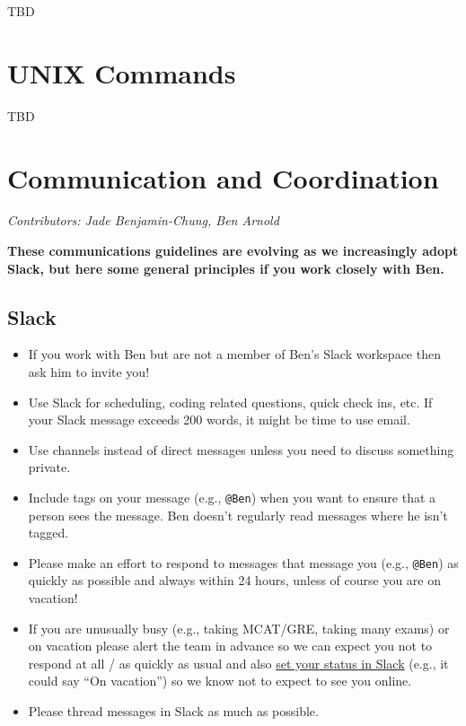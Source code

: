 \documentclass[]{book}
\begin{document}
TBD

\hypertarget{unix}{%
\chapter{UNIX Commands}\label{unix}}

TBD

\hypertarget{commcoord}{%
\chapter{Communication and Coordination}\label{commcoord}}

\emph{Contributors: Jade Benjamin-Chung, Ben Arnold}

\textbf{These communications guidelines are evolving as we increasingly adopt Slack, but here some general principles if you work closely with Ben.}

\hypertarget{slack}{%
\section{Slack}\label{slack}}

\begin{itemize}
\item
  If you work with Ben but are not a member of Ben's Slack workspace then ask him to invite you!
\item
  Use Slack for scheduling, coding related questions, quick check ins, etc. If your Slack message exceeds 200 words, it might be time to use email.
\item
  Use channels instead of direct messages unless you need to discuss something private.
\item
  Include tags on your message (e.g., \texttt{@Ben}) when you want to ensure that a person sees the message. Ben doesn't regularly read messages where he isn't tagged.
\item
  Please make an effort to respond to messages that message you (e.g., \texttt{@Ben}) as quickly as possible and always within 24 hours, unless of course you are on vacation!
\item
  If you are unusually busy (e.g., taking MCAT/GRE, taking many exams) or on vacation please alert the team in advance so we can expect you not to respond at all / as quickly as usual and also \href{https://get.slack.help/hc/en-us/articles/201864558-Set-your-Slack-status-and-availability}{set your status in Slack} (e.g., it could say ``On vacation'') so we know not to expect to see you online.
\item
  Please thread messages in Slack as much as possible.
\end{itemize}
\end{document}
